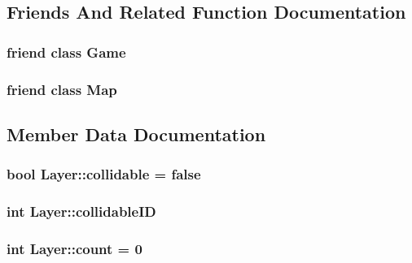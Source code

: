 \subsection{Friends And Related Function Documentation}
\subsubsection[{\texorpdfstring{Game}{Game}}]{\setlength{\rightskip}{0pt plus 5cm}friend class Game\hspace{0.3cm}{\ttfamily [friend]}}\hypertarget{classLayer_aa2fab026580d6f14280c2ffb8063a314}{}\label{classLayer_aa2fab026580d6f14280c2ffb8063a314}
\subsubsection[{\texorpdfstring{Map}{Map}}]{\setlength{\rightskip}{0pt plus 5cm}friend class {\bf Map}\hspace{0.3cm}{\ttfamily [friend]}}\hypertarget{classLayer_ad2f32e921244459f7cc6d50355429cc6}{}\label{classLayer_ad2f32e921244459f7cc6d50355429cc6}


\subsection{Member Data Documentation}
\subsubsection[{\texorpdfstring{collidable}{collidable}}]{\setlength{\rightskip}{0pt plus 5cm}bool Layer\+::collidable = false}\hypertarget{classLayer_a1ccf349686f89af692c7a4f4087ce279}{}\label{classLayer_a1ccf349686f89af692c7a4f4087ce279}
\subsubsection[{\texorpdfstring{collidable\+ID}{collidableID}}]{\setlength{\rightskip}{0pt plus 5cm}int Layer\+::collidable\+ID}\hypertarget{classLayer_ac84dc3efe941817d099a158ab0da7ebd}{}\label{classLayer_ac84dc3efe941817d099a158ab0da7ebd}
\subsubsection[{\texorpdfstring{count}{count}}]{\setlength{\rightskip}{0pt plus 5cm}int Layer\+::count = 0\hspace{0.3cm}{\ttfamily [protected]}}\hypertarget{classLayer_a2d61e86f27d4c5c43224281ec9fd6357}{}\label{classLayer_a2d61e86f27d4c5c43224281ec9fd6357}
